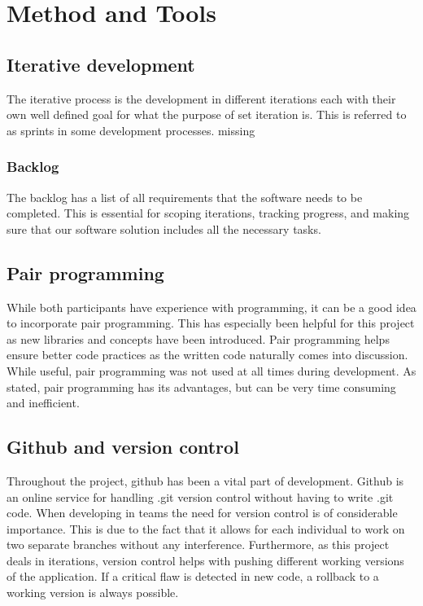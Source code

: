 \chapter{Method and Tools}
\label{chap:method-and-tools}

\section{Iterative development}
The iterative process is the development in different iterations each with their own well defined goal for what the purpose of set iteration is. This is referred to as sprints in some development processes. {\color{red}missing\\}

\subsection{Backlog}
The backlog has a list of all requirements that the software needs to be completed. This is essential for scoping iterations, tracking progress, and making sure that our software solution includes all the necessary tasks.

\section{Pair programming}
While both participants have experience with programming, it can be a good idea to incorporate pair programming. This has especially been helpful for this project as new libraries and concepts have been introduced. Pair programming helps ensure better code practices as the written code naturally comes into discussion. While useful, pair programming was not used at all times during development. As stated, pair programming has its advantages, but can be very time consuming and inefficient.

\section{Github and version control}
Throughout the project, github has been a vital part of development. Github is an online service for handling .git version control without having to write .git code. When developing in teams the need for version control is of considerable importance. This is due to the fact that it allows for each individual to work on two separate branches without any interference.
Furthermore, as this project deals in iterations, version control helps with pushing different working versions of the application. If a critical flaw is detected in new code, a rollback to a working version is always possible.
